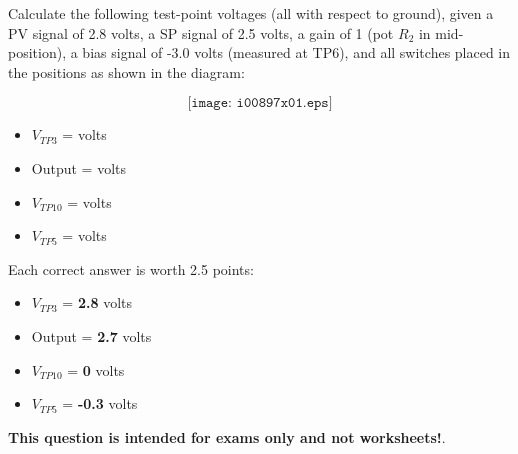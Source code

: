 

Calculate the following test-point voltages (all with respect to ground), given a PV signal of 2.8 volts, a SP signal of 2.5 volts, a gain of 1 (pot $R_2$ in mid-position), a bias signal of -3.0 volts (measured at TP6), and all switches placed in the positions as shown in the diagram:

$$\texttt{[image: i00897x01.eps]}$$

\begin{itemize}
\item{} $V_{TP3}$ = \underbar{\hskip 50pt} volts
\vskip 10pt
\item{} Output = \underbar{\hskip 50pt} volts
\vskip 10pt
\item{} $V_{TP10}$ = \underbar{\hskip 50pt} volts
\vskip 10pt
\item{} $V_{TP5}$ = \underbar{\hskip 50pt} volts
\end{itemize}







Each correct answer is worth 2.5 points:

\begin{itemize}
\item{} $V_{TP3}$ = {\bf 2.8} volts 
\vskip 10pt
\item{} Output = {\bf 2.7} volts 
\vskip 10pt
\item{} $V_{TP10}$ = {\bf 0} volts
\vskip 10pt
\item{} $V_{TP5}$ = {\bf -0.3} volts
\end{itemize}







{\bf This question is intended for exams only and not worksheets!}.



